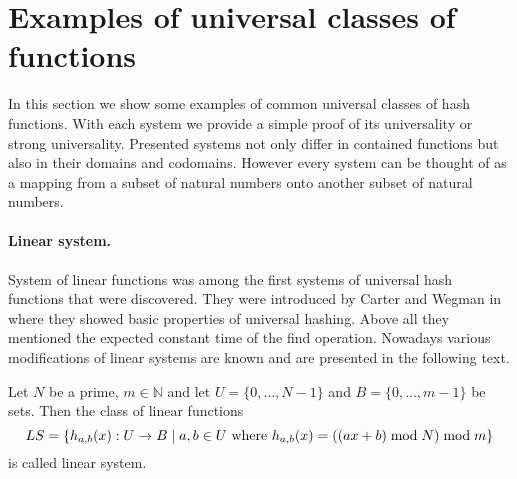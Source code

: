 \section{Examples of universal classes of functions}
In this section we show some examples of common universal classes of hash functions. With each system we provide a simple proof of its universality or strong universality. Presented systems not only differ in contained functions but also in their domains and codomains. However every system can be thought of as a mapping from a subset of natural numbers onto another subset of natural numbers.

\paragraph{Linear system.}
System of linear functions was among the first systems of universal hash functions that were discovered. They were introduced by Carter and Wegman in \cite{DBLP:journals/jcss/CarterW79} where they showed basic properties of universal hashing. Above all they mentioned the expected constant time of the find operation. Nowadays various modifications of linear systems are known and are presented in the following text. 

\begin{definition}
\label{definition-linear-system}
Let $N$ be a prime, $m \in \mathbb{N}$ and let $U = \{0, \dots, N - 1 \}$ and $B = \{0, \dots, m - 1\}$ be sets. Then the class of linear functions 
\[ LS = \{h_{a, b}(x): U \rightarrow B \mid a, b \in U \text{ where } h_{a, b}(x) = ((ax + b) \bmod N) \bmod m \} \]
is called linear system.
\end{definition}

